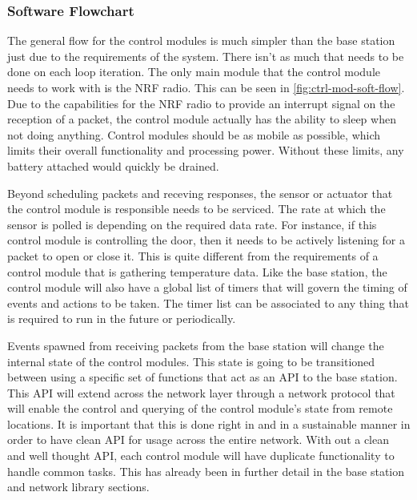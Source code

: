 \subsubsection{Software Flowchart}
The general flow for the control modules is much simpler than the base station
just due to the requirements of the system. There isn't as much that needs to
be done on each loop iteration. The only main module that the control module
needs to work with is the NRF radio. This can be seen in
\autoref{fig:ctrl-mod-soft-flow}. Due to the capabilities
for the NRF radio to provide an interrupt signal on the reception of a packet,
the control module actually has the ability to sleep when not doing anything.
Control modules should be as mobile as possible, which limits their overall
functionality and processing power. Without these limits, any battery attached
would quickly be drained.


Beyond scheduling packets and receving responses, the sensor or actuator that
the control module is responsible needs to be serviced. The rate at which the
sensor is polled is depending on the required data rate. For instance, if this
control module is controlling the door, then it needs to be actively listening
for a packet to open or close it. This is quite different from the requirements
of a control module that is gathering temperature data. Like the base station,
the control module will also have a global list of timers that will govern the
timing of events and actions to be taken. The timer list can be associated to
any thing that is required to run in the future or periodically.

Events spawned from receiving packets from the base station will change the
internal state of the control modules. This state is going to be transitioned
between using a specific set of functions that act as an API to the base
station. This API will extend across the network layer through a network
protocol that will enable the control and querying of the control module's state
from remote locations. It is important that this is done right in and in a
sustainable manner in order to have clean API for usage across the entire
network. With out a clean and well thought API, each control module will have
duplicate functionality to handle common tasks. This has already been in
further detail in the base station and network library sections.

